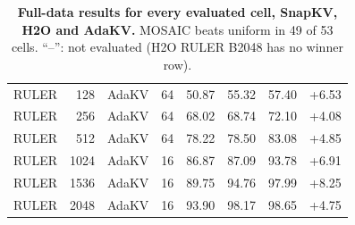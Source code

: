 \begin{table}[!b]
\begin{tabular}{@{}l r l r r r r r@{}}
    RULER & 128 & AdaKV & 64 & 50.87 & 55.32 & 57.40 & +6.53 \\
    RULER & 256 & AdaKV & 64 & 68.02 & 68.74 & 72.10 & +4.08 \\
    RULER & 512 & AdaKV & 64 & 78.22 & 78.50 & 83.08 & +4.85 \\
    RULER & 1024 & AdaKV & 16 & 86.87 & 87.09 & 93.78 & +6.91 \\
    RULER & 1536 & AdaKV & 16 & 89.75 & 94.76 & 97.99 & +8.25 \\
    RULER & 2048 & AdaKV & 16 & 93.90 & 98.17 & 98.65 & +4.75 \\
    \bottomrule
  \end{tabular}
  \caption{\textbf{Full-data results for every evaluated cell, SnapKV, H2O and AdaKV.} MOSAIC beats uniform in 49 of 53 cells. ``--'': not evaluated (H2O RULER B2048 has no winner row).}
  \label{tab:app-cells}
\end{table}

